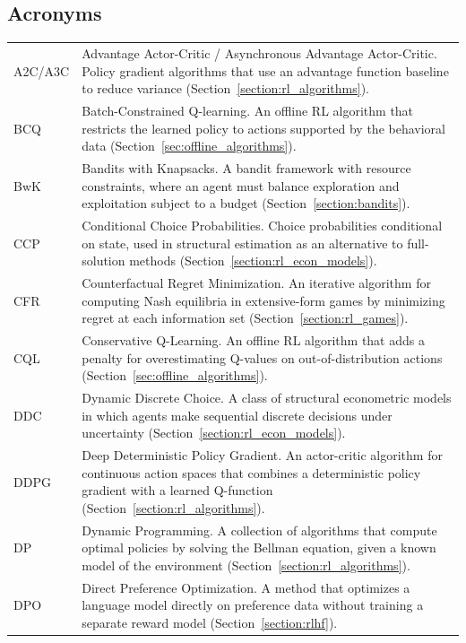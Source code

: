 
\subsection*{Acronyms}

\begin{longtable}{p{2.2cm} p{12cm}}
A2C/A3C & Advantage Actor-Critic / Asynchronous Advantage Actor-Critic. Policy gradient algorithms that use an advantage function baseline to reduce variance (Section~\ref{section:rl_algorithms}). \\[4pt]
BCQ & Batch-Constrained Q-learning. An offline RL algorithm that restricts the learned policy to actions supported by the behavioral data (Section~\ref{sec:offline_algorithms}). \\[4pt]
BwK & Bandits with Knapsacks. A bandit framework with resource constraints, where an agent must balance exploration and exploitation subject to a budget (Section~\ref{section:bandits}). \\[4pt]
CCP & Conditional Choice Probabilities. Choice probabilities conditional on state, used in structural estimation as an alternative to full-solution methods (Section~\ref{section:rl_econ_models}). \\[4pt]
CFR & Counterfactual Regret Minimization. An iterative algorithm for computing Nash equilibria in extensive-form games by minimizing regret at each information set (Section~\ref{section:rl_games}). \\[4pt]
CQL & Conservative Q-Learning. An offline RL algorithm that adds a penalty for overestimating Q-values on out-of-distribution actions (Section~\ref{sec:offline_algorithms}). \\[4pt]
DDC & Dynamic Discrete Choice. A class of structural econometric models in which agents make sequential discrete decisions under uncertainty (Section~\ref{section:rl_econ_models}). \\[4pt]
DDPG & Deep Deterministic Policy Gradient. An actor-critic algorithm for continuous action spaces that combines a deterministic policy gradient with a learned Q-function (Section~\ref{section:rl_algorithms}). \\[4pt]
DP & Dynamic Programming. A collection of algorithms that compute optimal policies by solving the Bellman equation, given a known model of the environment (Section~\ref{section:rl_algorithms}). \\[4pt]
DPO & Direct Preference Optimization. A method that optimizes a language model directly on preference data without training a separate reward model (Section~\ref{section:rlhf}). \\[4pt]

\end{longtable}
